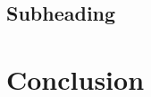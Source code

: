 \documentclass[12pt]{article}
\begin{document}
\subsection{Subheading}
\section{Conclusion}



\nocite{*}
\newpage









\end{document}
